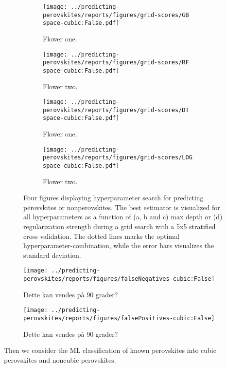 \begin{figure}[!tbp]
  \begin{subfigure}[b]{0.5\textwidth}
    \texttt{[image: ../predicting-perovskites/reports/figures/grid-scores/GB\\space-cubic:False.pdf]}
    \caption{Flower one.}
    \label{fig:h1-GB}
  \end{subfigure}%
  \hfill
  \begin{subfigure}[b]{0.5\textwidth}
    \texttt{[image: ../predicting-perovskites/reports/figures/grid-scores/RF\\space-cubic:False.pdf]}
    \caption{Flower two.}
    \label{fig:h1-RF}
  \end{subfigure}

  \begin{subfigure}[b]{0.5\textwidth}
    \texttt{[image: ../predicting-perovskites/reports/figures/grid-scores/DT\\space-cubic:False.pdf]}
    \caption{Flower one.}
    \label{fig:h1-DT}
  \end{subfigure}%
  \hfill
  \begin{subfigure}[b]{0.5\textwidth}
    \texttt{[image: ../predicting-perovskites/reports/figures/grid-scores/LOG\\space-cubic:False.pdf]}
    \caption{Flower two.}
    \label{fig:h1-LOG}
  \end{subfigure}
  \vspace*{-95mm}
  \caption{{Four figures displaying hyperparameter search for predicting perovskites or nonperovskites. The best estimator is visualized for all hyperparameters as a function of (a, b and c) max depth or (d) regularization strength during a grid search with a 5x5 stratified cross validation. The dotted lines marks the optimal hyperparameter-combination, while the error bars visualizes the standard deviation. }}
\end{figure}



\begin{figure}[!tbp]
  \texttt{[image: ../predicting-perovskites/reports/figures/falseNegatives-cubic:False]}
  \caption{Dette kan vendes på 90 grader?}
  \label{fig:h1-fn}
\end{figure}

\begin{figure}[!tbp]
  \texttt{[image: ../predicting-perovskites/reports/figures/falsePositives-cubic:False]}
  \caption{Dette kan vendes på 90 grader?}
  \label{fig:h1-fp}
\end{figure}


Then we consider the ML classification of known perovskites into cubic perovskites and noncubic perovskites.

